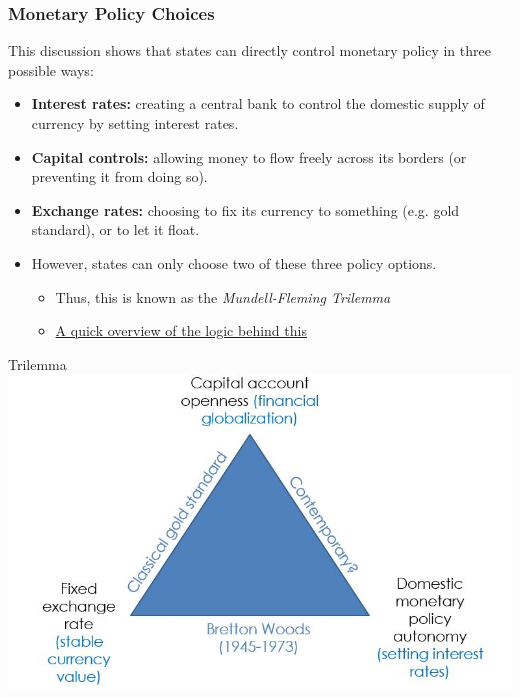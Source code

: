 \documentclass{beamer}
\begin{document}
\begin{frame} 
	\frametitle{\LARGE{Monetary Policy Choices}}
	This discussion shows that states can directly control monetary policy in three possible ways:
	\begin{itemize}
		\item \textbf{Interest rates:} creating a central bank to control the domestic supply of currency by setting interest rates. \pause 
		\item \textbf{Capital controls:} allowing money to flow freely across its borders (or preventing it from doing so). \pause 
		\item \textbf{Exchange rates:} choosing to fix its currency to something (e.g. gold standard), or to let it float. \pause 
		\item However, states can only choose two of these three policy options. \pause 
		\begin{itemize}
			\item Thus, this is known as the \textit{Mundell-Fleming Trilemma} \pause
			\item \href{https://www.youtube.com/watch?v=yt0m7N3bqXM}{A quick overview of the logic behind this} 
		\end{itemize}
	\end{itemize}
\end{frame}

\begin{frame}{\LARGE Trilemma}
	\centering
	\includegraphics[width=\textwidth,height=0.8\textheight,keepaspectratio]{trilemma.JPG}
\end{frame}
\end{document}
